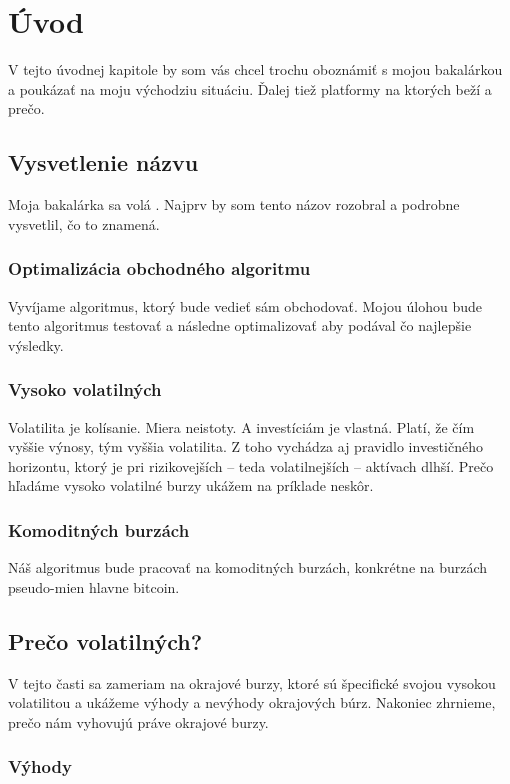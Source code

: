 \chapter{Úvod}\label{chap:intro}

V tejto úvodnej kapitole by som vás chcel trochu oboznámiť s mojou bakalárkou a poukázať na moju východziu situáciu. Ďalej tiež platformy na ktorých beží a prečo.
\section{Vysvetlenie názvu}
Moja bakalárka sa volá . Najprv by som tento názov rozobral a podrobne vysvetlil, čo to znamená.
\subsection{Optimalizácia obchodného algoritmu}
Vyvíjame algoritmus, ktorý bude vedieť sám obchodovať. Mojou úlohou bude tento algoritmus testovať a následne optimalizovať aby podával čo najlepšie výsledky.
\subsection{Vysoko volatilných}
Volatilita\cite{Volatilita} je kolísanie. Miera neistoty. A investíciám je vlastná. Platí, že čím vyššie výnosy, tým vyššia volatilita. Z toho vychádza aj pravidlo investičného horizontu, ktorý je pri rizikovejších – teda volatilnejších – aktívach dlhší. Prečo hľadáme  vysoko volatilné burzy ukážem na príklade neskôr.
\subsection{Komoditných burzách}
Náš algoritmus bude pracovať na komoditných burzách, konkrétne na burzách pseudo-mien  hlavne bitcoin. 

\section{Prečo volatilných?}
V tejto časti sa zameriam na okrajové burzy, ktoré sú špecifické svojou vysokou volatilitou
a ukážeme výhody a nevýhody okrajových búrz. Nakoniec zhrnieme, prečo nám vyhovujú práve okrajové burzy.
\subsection{Výhody}
